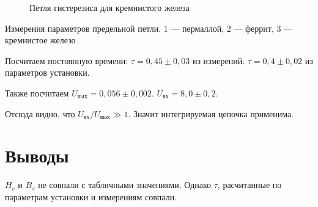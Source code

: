 \documentclass[a4paper,12pt]{article}
\begin{document}
\begin{figure}[H]
  \centering
  
  \caption{Петля гистерезиса для кремнистого железа}
  \label{fig:fesi}
\end{figure}

\begin{table}[h]
  \centering
  
  \caption{Измерения параметров предельной петли. 1 --- пермаллой, 2 --- феррит, 3 --- кремнистое железо}
  \label{tbl:char}
\end{table}

Посчитаем постоянную времени: $\tau = 0,45 \pm 0,03$ из измерений. $\tau = 0,4 \pm 0,02$ из параметров установки.

Также посчитаем $U_{вых} = 0,056 \pm 0,002$.
$U_{вх} = 8,0 \pm 0,2$.

Отсюда видно, что $U_{вх}/U_{вых} \gg 1$. Значит интегрируемая цепочка применима.

\section{Выводы}
$H_c$ и $B_s$ не совпали с табличными значениями. Однако $\tau$, расчитанные по параметрам установки и измерениям совпали.
\end{document}

